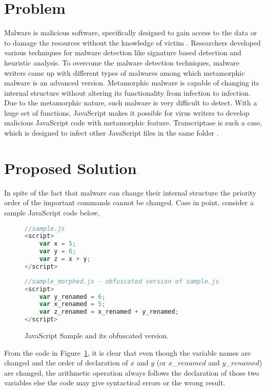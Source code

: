 \section{Problem} 

Malware is malicious software, specifically designed to gain access to the data or to damage the resources without the knowledge of victim \cite{bib4}. Researchers developed various techniques for malware detection like signature based detection and heuristic analysis. To overcome the malware detection techniques, malware writers came up with different types of malwares among which metamorphic malware is an advanced version. Metamorphic malware is capable of changing its internal structure without altering its functionality from infection to infection. Due to the metamorphic nature, such malware is very difficult to detect. With a huge set of functions, JavaScript makes it possible for virus writers to develop malicious JavaScript code with metamorphic feature. Transcriptase is such a case, which is designed to infect other JavaScript files in the same folder \cite{bib5}.

\section{Proposed Solution}

In spite of the fact that malware can change their internal structure the priority order of the important commands cannot be changed. Case in point, consider a sample JavaScript code below,

\begin{figure}
  \centering

\begin{lstlisting}[language=JavaScript]
//sample.js
<script>
    var x = 5;
    var y = 6;
    var z = x + y;
</script>
\end{lstlisting}

\begin{lstlisting}[language=JavaScript]
//sample_morphed.js - obfuscated version of sample.js
<script>
    var y_renamed = 6;
    var x_renamed = 5;
    var z_renamed = x_renamed + y_renamed;
</script>
\end{lstlisting}

    \caption[JavaScript Sample and its obfuscated version.]{JavaScript Sample and its obfuscated version.}
\label{fig:jssample}
\end{figure}

From the code in Figure~\ref{fig:jssample}, it is clear that even though the variable names are changed and the order of declaration of $x$ and $y$  (or $x$\_$renamed$ and $y$\_$renamed$) are changed, the arithmetic operation always follows the declaration of those two variables else the code may give syntactical errors or the wrong result.

